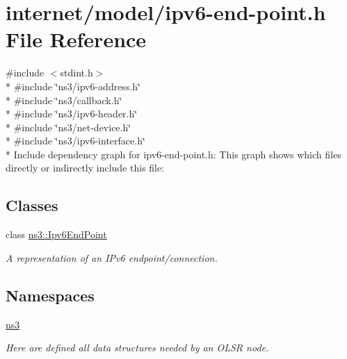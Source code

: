 \hypertarget{ipv6-end-point_8h}{}\section{internet/model/ipv6-\/end-\/point.h File Reference}
\label{ipv6-end-point_8h}
{\ttfamily \#include $<$stdint.\+h$>$}\\*
{\ttfamily \#include \char`\"{}ns3/ipv6-\/address.\+h\char`\"{}}\\*
{\ttfamily \#include \char`\"{}ns3/callback.\+h\char`\"{}}\\*
{\ttfamily \#include \char`\"{}ns3/ipv6-\/header.\+h\char`\"{}}\\*
{\ttfamily \#include \char`\"{}ns3/net-\/device.\+h\char`\"{}}\\*
{\ttfamily \#include \char`\"{}ns3/ipv6-\/interface.\+h\char`\"{}}\\*
Include dependency graph for ipv6-\/end-\/point.h\+:
This graph shows which files directly or indirectly include this file\+:
\subsection*{Classes}
\begin{DoxyCompactItemize}
\item 
class \hyperlink{classns3_1_1Ipv6EndPoint}{ns3\+::\+Ipv6\+End\+Point}
\begin{DoxyCompactList}\small\item\em A representation of an I\+Pv6 endpoint/connection. \end{DoxyCompactList}\end{DoxyCompactItemize}
\subsection*{Namespaces}
\begin{DoxyCompactItemize}
\item 
 \hyperlink{namespacens3}{ns3}
\begin{DoxyCompactList}\small\item\em Here are defined all data structures needed by an O\+L\+SR node. \end{DoxyCompactList}\end{DoxyCompactItemize}
